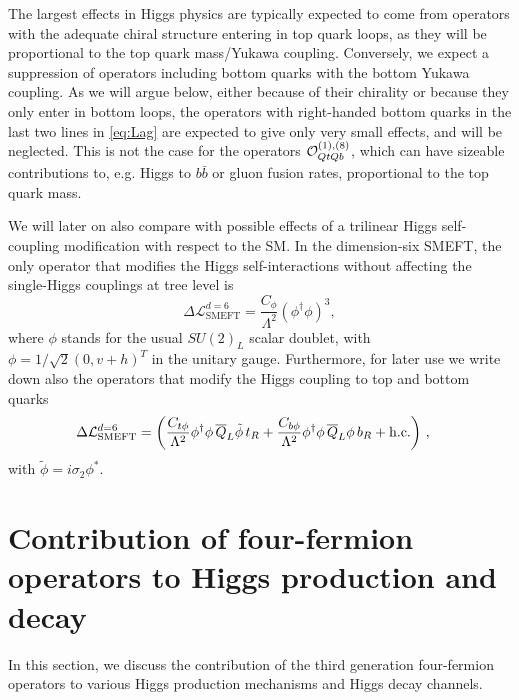 The largest effects in Higgs physics are typically expected to come from operators with the adequate chiral structure entering in top quark loops, as they will be proportional to the top quark mass/Yukawa coupling. 
Conversely, we expect a suppression of operators including bottom quarks with the bottom Yukawa coupling. 
As we will argue below, either because of their chirality or because they only enter in bottom loops, the operators with right-handed bottom quarks in the last two lines in \eqref{eq:Lag} are expected to give only very small effects, and will be neglected. 
This is not the case for the operators  ${\cal O}_{QtQb}^{(1),(8)}$, which can have sizeable contributions to, e.g. Higgs to $b\bar{b}$ or gluon fusion rates, proportional to the top quark mass. 

We will later on also compare with possible effects of a trilinear Higgs self-coupling modification with respect to the SM. In the dimension-six SMEFT, the only operator that modifies the Higgs self-interactions without affecting the single-Higgs couplings at tree level is
%
\begin{equation}
	\Delta \mathcal{L}_{\mathrm{SMEFT}}^{d=6}=\frac{C_{\phi}}{\Lambda^2}(\phi^\dagger \phi)^3,
\end{equation}
%
where $\phi$ stands for the usual $SU(2)_L$ scalar doublet, with $\phi=1/\sqrt{2}(0,v+h)^T$ in the unitary gauge.
Furthermore, for later use we write down also the operators that modify the Higgs coupling to top and bottom quarks
\begin{equation}
	\begin{split}
		\Delta \mathcal{L}_{\mathrm{SMEFT}}^{d=6}&= \left(\frac{C_{t\phi}}{\Lambda^2}\phi^\dagger \phi ~\!\overline{Q}_L\tilde{\phi}~\!t_R+\frac{C_{b\phi}}{\Lambda^2}\phi^\dagger \phi ~\!\overline{Q}_L \phi~\! b_R+\mathrm{h.c.}\right)\,,
	\end{split}
\end{equation}
%
with $\tilde{\phi}=i \sigma_2 \phi^*$.


\section{Contribution of four-fermion operators to Higgs production and decay \label{sec:Higgs}}
In this section, we discuss the contribution of the third generation four-fermion operators to various Higgs production mechanisms  and  Higgs decay channels.

